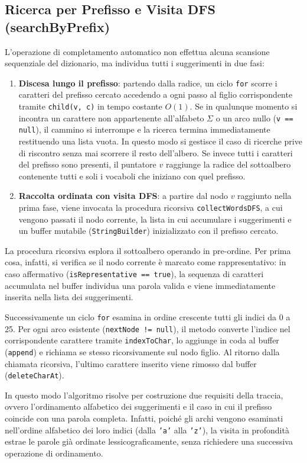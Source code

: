 \documentclass[11pt,a4paper]{article}
\begin{document}
\subsection{Ricerca per Prefisso e Visita DFS (searchByPrefix)}
L'operazione di completamento automatico non effettua alcuna scansione sequenziale del dizionario, ma individua tutti i suggerimenti in due fasi:
\begin{enumerate}
    \item \textbf{Discesa lungo il prefisso}: partendo dalla radice, un ciclo \texttt{for} scorre i caratteri del prefisso cercato accedendo a ogni passo al figlio corrispondente tramite \texttt{child(v, c)} in tempo costante $O(1)$. Se in qualunque momento si incontra un carattere non appartenente all'alfabeto $\Sigma$ o un arco nullo (\texttt{v == null}), il cammino si interrompe e la ricerca termina immediatamente restituendo una lista vuota. In questo modo si gestisce il caso di ricerche prive di riscontro senza mai scorrere il resto dell'albero. Se invece tutti i caratteri del prefisso sono presenti, il puntatore $v$ raggiunge la radice del sottoalbero contenente tutti e soli i vocaboli che iniziano con quel prefisso.
    \item \textbf{Raccolta ordinata con visita DFS}: a partire dal nodo $v$ raggiunto nella prima fase, viene invocata la procedura ricorsiva \texttt{collectWordsDFS}, a cui vengono passati il nodo corrente, la lista in cui accumulare i suggerimenti e un buffer mutabile (\texttt{StringBuilder}) inizializzato con il prefisso cercato.
\end{enumerate}
La procedura ricorsiva esplora il sottoalbero operando in pre-ordine. Per prima cosa, infatti, si verifica se il nodo corrente è marcato come rappresentativo: in caso affermativo (\texttt{isRepresentative == true}), la sequenza di caratteri accumulata nel buffer individua una parola valida e viene immediatamente inserita nella lista dei suggerimenti.

Successivamente un ciclo \texttt{for} esamina in ordine crescente tutti gli indici da 0 a 25. Per ogni arco esistente (\texttt{nextNode != null}), il metodo converte l'indice nel corrispondente carattere tramite \texttt{indexToChar}, lo aggiunge in coda al buffer (\texttt{append}) e richiama se stesso ricorsivamente sul nodo figlio. Al ritorno dalla chiamata ricorsiva, l'ultimo carattere inserito viene rimosso dal buffer (\texttt{deleteCharAt}).

In questo modo l'algoritmo risolve per costruzione due requisiti della traccia, ovvero l'ordinamento alfabetico dei suggerimenti e il caso in cui il prefisso coincide con una parola completa.
Infatti, poiché gli archi vengono esaminati nell'ordine alfabetico dei loro indici (dalla \texttt{'a'} alla \texttt{'z'}), la visita in profondità estrae le parole già ordinate lessicograficamente, senza richiedere una successiva operazione di ordinamento.
\end{document}
